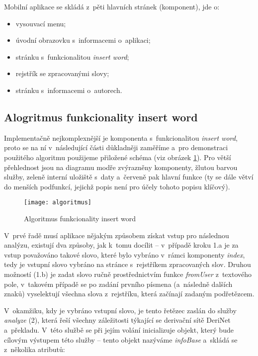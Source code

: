Mobilní aplikace se skládá z~pěti hlavních stránek (komponent), jde o:

\begin{itemize}
\tightlist
\item
  vysouvací menu;
\item
  úvodní obrazovku s~informacemi o~aplikaci;
\item
  stránku s~funkcionalitou \emph{insert word};
\item
  rejstřík se zpracovanými slovy;
\item
  stránku s~informacemi o~autorech.
\end{itemize}

\hypertarget{insert word}{%
\subsection*{Alogritmus funkcionality insert word}\label{insert word}}

Implementačně nejkomplexnější je komponenta s~funkcionalitou
\emph{insert word}, proto se na ní v~následující části důkladněji
zaměříme a~pro demonstraci použitého algoritmu použijeme přiložené
schéma (viz obrázek \ref{algoritmus}). Pro větší přehlednost jsou na
diagramu modře zvýrazněny komponenty, žlutou barvou služby, zeleně
interní uložiště s~daty a~červeně pak hlavní funkce (ty se dále větví do
menších podfunkcí, jejichž popis není pro účely tohoto popisu klíčový).

\begin{figure}[ht]   
    \centering
    \texttt{[image: algoritmus]}  
    \caption{Algoritmus funkcionality insert word}
    \label{algoritmus}
 \end{figure}

V~prvé řadě musí aplikace nějakým způsobem získat vstup pro následnou
analýzu, existují dva způsoby, jak k~tomu docílit -- v~případě kroku 1.a
je za vstup považováno takové slovo, které bylo vybráno v~rámci
komponenty \emph{index}, tedy je vstupní slovo vybráno na stránce
s~rejstříkem zpracovaných slov. Druhou možností (1.b) je zadat slovo ručně
prostřednictvím funkce \emph{fromUser} z~textového pole, v~takovém
případě se po zadání prvního písmena (a~následně dalších znaků)
vyselektují všechna slova z~rejstříku, která začínají zadaným
podřetězcem.

V~okamžiku, kdy je vybráno vstupní slovo, je tento řetězec zaslán do
služby \emph{analyze} (2), která řeší všechny záležitosti týkající se
derivační sítě DeriNet a~překladu. V~této službě se při jejím volání
inicializuje objekt, který bude cílovým výstupem této služby -- tento
objekt nazýváme \emph{infoBase} a~skládá se z~několika atributů:


